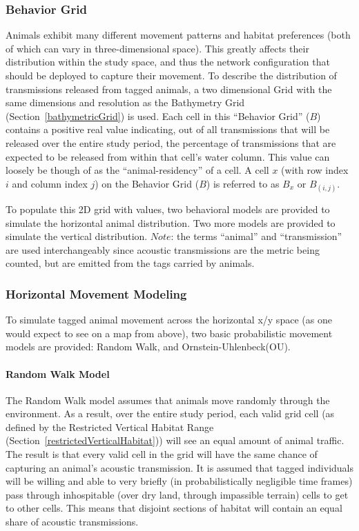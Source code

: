 \subsubsection{Behavior Grid}
\label{behaviorGrid}
Animals exhibit many different movement patterns and habitat preferences (both of which can vary in three-dimensional space).  This greatly affects their distribution within the study space, and thus the network configuration that should be deployed to capture their movement.  To describe the distribution of transmissions released from tagged animals, a two dimensional Grid with the same dimensions and resolution as the Bathymetry Grid (Section~\ref{bathymetricGrid}) is used.  Each cell in this ``Behavior Grid'' ($B$) contains a positive real value indicating, out of all transmissions that will be released over the entire study period, the percentage of transmissions that are expected to be released from within that cell's water column.  This value can loosely be though of as the ``animal-residency'' of a cell.  A cell $x$ (with row index $i$ and column index $j$) on the Behavior Grid ($B$) is referred to as $B_x$ or $B_{(i,j)}$.

To populate this 2D grid with values, two behavioral models are provided to simulate the horizontal animal distribution.  Two more models are provided to simulate the vertical distribution.  $Note$: the terms ``animal'' and ``transmission'' are used interchangeably since acoustic transmissions are the metric being counted, but are emitted from the tags carried by animals.  


\subsubsection{Horizontal Movement Modeling}
\label{animalMovementModel}
To simulate tagged animal movement across the horizontal x/y space (as one would expect to see on a map from above), two basic probabilistic movement models are provided: Random Walk, and Ornstein-Uhlenbeck(OU).  

\paragraph{Random Walk Model}
\label{randomWalkModel}
The Random Walk model assumes that animals move randomly through the environment.  As a result, over the entire study period, each valid grid cell (as defined by the Restricted Vertical Habitat Range (Section~\ref{restrictedVerticalHabitat})) will see an equal amount of animal traffic.  The result is that every valid cell  in the grid will have the same chance of capturing an animal's acoustic transmission.  It is assumed that tagged individuals will be willing and able to very briefly (in probabilistically negligible time frames) pass through inhospitable (over dry land, through impassible terrain) cells to get to other cells.  This means that disjoint sections of habitat will contain an equal share of acoustic transmissions.

